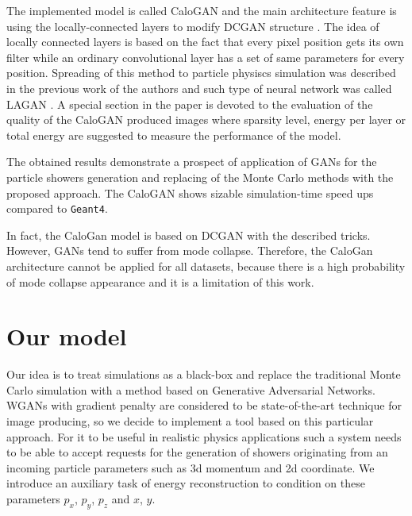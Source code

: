 \documentclass{webofc}
\begin{document}
The implemented model is called CaloGAN and the main architecture feature is using the locally-connected layers \cite{taigman2014deepface} to modify DCGAN structure \cite{radford2015unsupervised}. The idea of locally connected layers is based on the fact that every pixel position gets its own filter while an ordinary convolutional layer has a set of  same parameters for every position. Spreading of this method to particle physiscs simulation was described in the previous work of the authors and such type of neural network was called LAGAN \cite{de2017learning}. A special section in the paper is devoted to the evaluation of the quality of the CaloGAN produced images where  sparsity level,  energy per layer or total energy are suggested to measure the performance of the model. 

The obtained results demonstrate a prospect of application of GANs for the particle showers generation and replacing of the Monte Carlo methods with the proposed approach. The CaloGAN shows sizable simulation-time speed ups compared to \texttt{Geant4}. 

In fact, the CaloGan model is based on DCGAN with the described tricks. However, GANs tend to suffer from mode collapse. Therefore, the CaloGan architecture cannot be applied for all datasets, because there is a high probability of mode collapse appearance and it is a limitation of this work.

\section{Our model} \label{sec:model}
Our idea is to treat simulations as a black-box and replace the traditional Monte Carlo simulation with a method based on Generative Adversarial Networks. WGANs with gradient penalty are considered to be state-of-the-art technique for image producing, so we decide to implement a tool based on this particular approach. For it to be useful in realistic physics applications such a system needs to be able to accept requests for the generation of showers originating from an incoming particle parameters such as 3d momentum and 2d coordinate. We introduce an auxiliary task of energy reconstruction to condition on these parameters $p_x$, $p_y$, $p_z$ and $x$, $y$.
\end{document}
